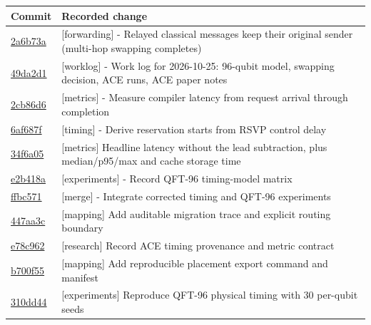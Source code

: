 \begin{longtable}{p{.15\linewidth}p{.77\linewidth}}\toprule Commit & Recorded change\\\midrule\endhead
\href{https://github.com/sanjeevkrishnaa/Compiler-Driven-ACE/commit/2a6b73a1c232912a54d5a5254312461526473c14}{2a6b73a} & [forwarding] - Relayed classical messages keep their original sender (multi-hop swapping completes) \\
\href{https://github.com/sanjeevkrishnaa/Compiler-Driven-ACE/commit/49da2d1aef1021c3bada3097b96b32dcce172355}{49da2d1} & [worklog] - Work log for 2026-10-25: 96-qubit model, swapping decision, ACE runs, ACE paper notes \\
\href{https://github.com/sanjeevkrishnaa/Compiler-Driven-ACE/commit/2cb86d664950c4c1757d50d931b462f6faa60814}{2cb86d6} & [metrics] - Measure compiler latency from request arrival through completion \\
\href{https://github.com/sanjeevkrishnaa/Compiler-Driven-ACE/commit/6af687f2c80906a693f3da56bd2f3b2849a33111}{6af687f} & [timing] - Derive reservation starts from RSVP control delay \\
\href{https://github.com/sanjeevkrishnaa/Compiler-Driven-ACE/commit/34f6a05ed922a45420f3aa31a599f4cd601acf29}{34f6a05} & [metrics] Headline latency without the lead subtraction, plus median/p95/max and cache storage time \\
\href{https://github.com/sanjeevkrishnaa/Compiler-Driven-ACE/commit/e2b418afa7e5c01164d66222ff356167f4327a8d}{e2b418a} & [experiments] - Record QFT-96 timing-model matrix \\
\href{https://github.com/sanjeevkrishnaa/Compiler-Driven-ACE/commit/ffbc571373919dcea3cbe11a118a2eecc19ffbcd}{ffbc571} & [merge] - Integrate corrected timing and QFT-96 experiments \\
\href{https://github.com/sanjeevkrishnaa/Compiler-Driven-ACE/commit/447aa3c90a1966f5e192e2fd735286c8ab3a30bf}{447aa3c} & [mapping] Add auditable migration trace and explicit routing boundary \\
\href{https://github.com/sanjeevkrishnaa/Compiler-Driven-ACE/commit/e78c962e9498163a1b252d5e8e2f187252a6157b}{e78c962} & [research] Record ACE timing provenance and metric contract \\
\href{https://github.com/sanjeevkrishnaa/Compiler-Driven-ACE/commit/b700f55a3fe430a7b0c9232d1c45da114b5b44ea}{b700f55} & [mapping] Add reproducible placement export command and manifest \\
\href{https://github.com/sanjeevkrishnaa/Compiler-Driven-ACE/commit/310dd441b739742c44a77f8cbae4b19c0ec5a23b}{310dd44} & [experiments] Reproduce QFT-96 physical timing with 30 per-qubit seeds \\

\end{longtable}
